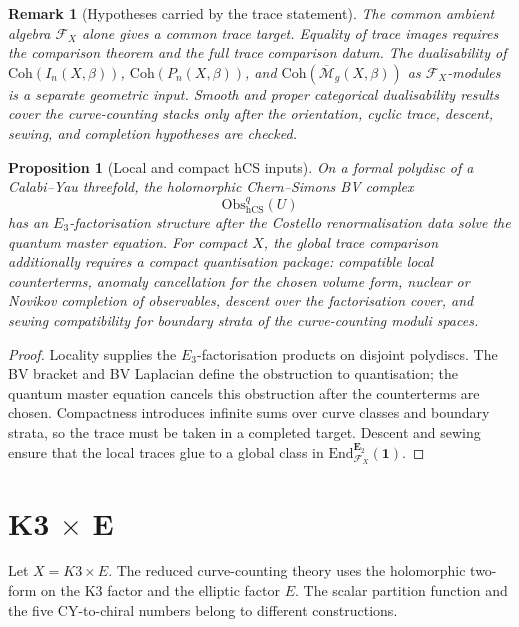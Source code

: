 \documentclass[11pt]{article}
\newtheorem{proposition}[theorem]{Proposition}
\newtheorem{remark}[theorem]{Remark}
\providecommand{\cF}{\mathcal{F}}
\providecommand{\cM}{\mathcal{M}}
\providecommand{\Coh}{\mathrm{Coh}}
\providecommand{\End}{\mathrm{End}}
\providecommand{\Obs}{\mathrm{Obs}}
\providecommand{\hCS}{\mathrm{hCS}}
\providecommand{\Ethree}{E_3}
\providecommand{\bE}{\mathbf{E}}
\begin{document}
\begin{remark}[Hypotheses carried by the trace statement]
The common ambient algebra \(\cF_X\) alone gives a common trace target.
Equality of trace images requires the comparison theorem and the full
trace comparison datum.  The dualisability of \(\Coh(I_n(X,\beta))\),
\(\Coh(P_n(X,\beta))\), and
\(\Coh(\overline{\cM}_g(X,\beta))\) as \(\cF_X\)-modules is a separate
geometric input.  Smooth and proper categorical dualisability results
cover the curve-counting stacks only after the orientation, cyclic
trace, descent, sewing, and completion hypotheses are checked.
\end{remark}

\begin{proposition}[Local and compact hCS inputs]
On a formal polydisc of a Calabi--Yau threefold, the holomorphic
Chern--Simons BV complex
\[
  \Obs_{\hCS}^q(U)
\]
has an \(\Ethree\)-factorisation structure after the Costello
renormalisation data solve the quantum master equation.  For compact
\(X\), the global trace comparison additionally requires a compact
quantisation package: compatible local counterterms, anomaly
cancellation for the chosen volume form, nuclear or Novikov completion
of observables, descent over the factorisation cover, and sewing
compatibility for boundary strata of the curve-counting moduli spaces.
\end{proposition}

\begin{proof}
Locality supplies the \(\Ethree\)-factorisation products on disjoint
polydiscs.  The BV bracket and BV Laplacian define the obstruction to
quantisation; the quantum master equation cancels this obstruction
after the counterterms are chosen.  Compactness introduces infinite
sums over curve classes and boundary strata, so the trace must be
taken in a completed target.  Descent and sewing ensure that the local
traces glue to a global class in
\(\End_{\cF_X}^{\bE_2}(\mathbf 1)\).
\end{proof}

\section{K3 \(\times\) E}

Let \(X=K3\times E\).  The reduced curve-counting theory uses the
holomorphic two-form on the K3 factor and the elliptic factor \(E\).
The scalar partition function and the five CY-to-chiral numbers
belong to different constructions.
\end{document}
